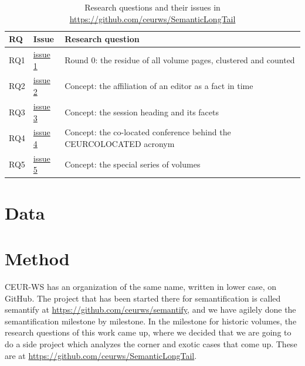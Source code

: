 \documentclass{ceurart}
\begin{document}
\begin{table}[h]
\caption{Research questions and their issues in \url{https://github.com/ceurws/SemanticLongTail}}\label{tab:rq}
\begin{tabular}{lll}
\hline
RQ & Issue & Research question \\
\hline
RQ1 & \href{https://github.com/ceurws/SemanticLongTail/issues/1}{issue 1} & Round 0: the residue of all volume pages, clustered and counted \\
RQ2 & \href{https://github.com/ceurws/SemanticLongTail/issues/2}{issue 2} & Concept: the affiliation of an editor as a fact in time \\
RQ3 & \href{https://github.com/ceurws/SemanticLongTail/issues/3}{issue 3} & Concept: the session heading and its facets \\
RQ4 & \href{https://github.com/ceurws/SemanticLongTail/issues/4}{issue 4} & Concept: the co-located conference behind the CEURCOLOCATED acronym \\
RQ5 & \href{https://github.com/ceurws/SemanticLongTail/issues/5}{issue 5} & Concept: the special series of volumes \\
\hline
\end{tabular}
\end{table}

\section{Data}\label{sec:data}

\section{Method}\label{sec:method}

CEUR-WS has an organization of the same name, written in lower case, on
GitHub. The project that
has been started there for semantification is called semantify at
\url{https://github.com/ceurws/semantify}, and we have agilely done the
semantification milestone by milestone. In the milestone for historic volumes,
the research questions of this work came up, where we decided that we are going to
do a side project which analyzes the corner and exotic cases that come up.
These are at \url{https://github.com/ceurws/SemanticLongTail}.
\end{document}
